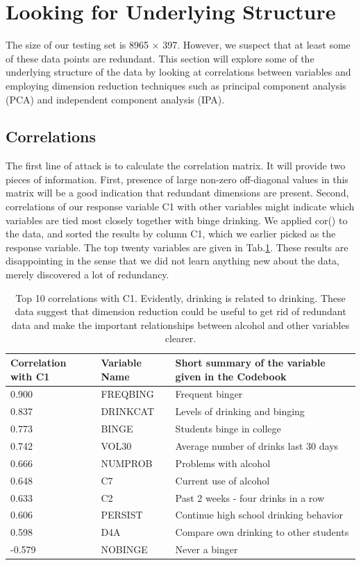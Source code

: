 \section{Looking for Underlying Structure}
\label{sec:PCA}
The size of our testing set is 8965 $\times$ 397. However, we suspect that at least some of these data points are redundant. This section will explore some of the underlying structure of the data by looking at correlations between variables and employing dimension reduction techniques such as principal component analysis (PCA) and independent component analysis (IPA). 
\subsection{Correlations}
The first line of attack is to calculate the correlation matrix. It will provide two pieces of information. First, presence of large non-zero off-diagonal values in this matrix will be a good indication that redundant dimensions are present. Second, correlations of our response variable C1 with other variables might indicate which variables are tied most closely together with binge drinking. We applied cor() to the data, and sorted the results by column C1, which we earlier picked as the response variable. The top twenty variables are given in Tab.\ref{correlations}. These results are disappointing in the sense that we did not learn anything new about the data, merely discovered a lot of redundancy. 

\begin{center}
\begin{table}[ht]
\begin{tabular}{l l l}
\hline \hline
Correlation with C1 & Variable Name &Short summary of the variable given in the Codebook\\ \hline 
0.900 & FREQBING	&Frequent binger\\
0.837 & DRINKCAT	&Levels of drinking and binging\\
0.773 & BINGE		&Students binge in college\\
0.742 & VOL30		&Average number of drinks last 30 days\\
0.666 & NUMPROB	&Problems with alcohol\\
0.648 & C7		&Current use of alcohol\\
0.633 & C2		&Past 2 weeks - four drinks in a row\\
0.606 & PERSIST	&Continue high school drinking behavior\\
0.598 & D4A		&Compare own drinking to other students\\
-0.579 & NOBINGE	&Never a binger\\
\hline
\end{tabular}
\caption{Top 10 correlations with C1. Evidently, drinking is related to drinking. These data suggest that dimension reduction could be useful to get rid of redundant data and make the important relationships between alcohol and other variables clearer.}
\label{correlations}
\end{table}
\end{center}

